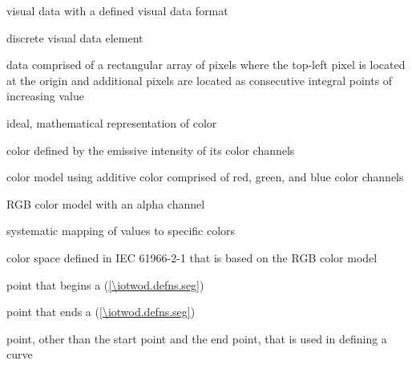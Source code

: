 %
visual data with a defined visual data format

%
discrete visual data element

%
data comprised of a rectangular array of pixels where the top-left pixel is located at the origin and additional pixels are located as consecutive integral points of increasing value

%
ideal, mathematical representation of color

%
color defined by the emissive intensity of its color channels

%
%
color model using additive color comprised of red, green, and blue color channels

%
%
RGB color model with an alpha channel

%
systematic mapping of values to specific colors

%
%
color space defined in IEC 61966-2-1 that is based on the RGB color model

%
point that begins a  (\ref{\iotwod.defns.seg})

%
point that ends a  (\ref{\iotwod.defns.seg})

%
point, other than the start point and the end point, that is used in defining a curve

